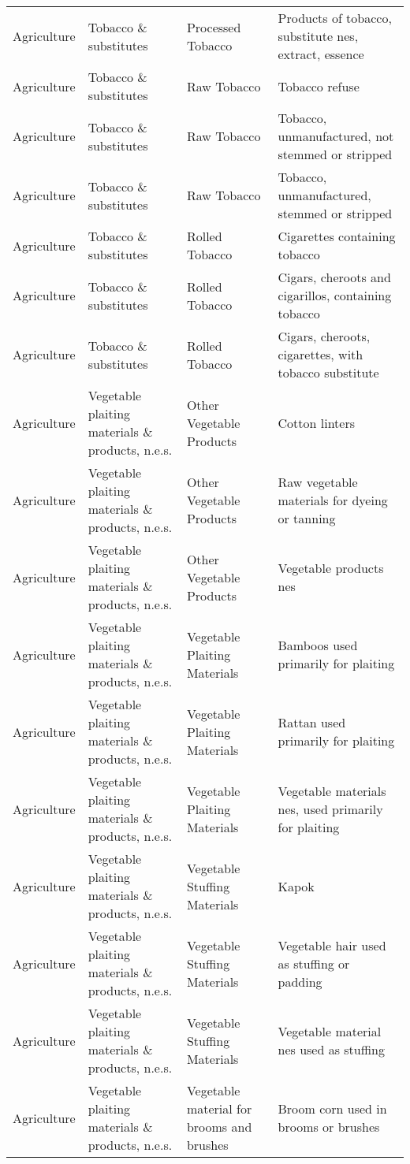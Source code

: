 \begin{appendices}
\begin{xltabular}{\textwidth}{|p{0.07\textwidth}|p{0.28\textwidth}|p{0.24\textwidth}|p{0.31\textwidth}|}
	Agriculture & Tobacco \& substitutes & Processed Tobacco & Products of tobacco, substitute nes, extract, essence \\
	Agriculture & Tobacco \& substitutes & Raw Tobacco & Tobacco refuse \\
	Agriculture & Tobacco \& substitutes & Raw Tobacco & Tobacco, unmanufactured, not stemmed or stripped \\
	Agriculture & Tobacco \& substitutes & Raw Tobacco & Tobacco, unmanufactured, stemmed or stripped \\
	Agriculture & Tobacco \& substitutes & Rolled Tobacco & Cigarettes containing tobacco \\
	Agriculture & Tobacco \& substitutes & Rolled Tobacco & Cigars, cheroots and cigarillos, containing tobacco \\
	Agriculture & Tobacco \& substitutes & Rolled Tobacco & Cigars, cheroots, cigarettes, with tobacco substitute \\
	Agriculture & Vegetable plaiting materials \& products, n.e.s. & Other Vegetable Products & Cotton linters \\
	Agriculture & Vegetable plaiting materials \& products, n.e.s. & Other Vegetable Products & Raw vegetable materials for dyeing or tanning \\
	Agriculture & Vegetable plaiting materials \& products, n.e.s. & Other Vegetable Products & Vegetable products nes \\
	Agriculture & Vegetable plaiting materials \& products, n.e.s. & Vegetable Plaiting Materials & Bamboos used primarily for plaiting \\
	Agriculture & Vegetable plaiting materials \& products, n.e.s. & Vegetable Plaiting Materials & Rattan used primarily for plaiting \\
	Agriculture & Vegetable plaiting materials \& products, n.e.s. & Vegetable Plaiting Materials & Vegetable materials nes, used primarily for plaiting \\
	Agriculture & Vegetable plaiting materials \& products, n.e.s. & Vegetable Stuffing Materials & Kapok \\
	Agriculture & Vegetable plaiting materials \& products, n.e.s. & Vegetable Stuffing Materials & Vegetable hair used as stuffing or padding \\
	Agriculture & Vegetable plaiting materials \& products, n.e.s. & Vegetable Stuffing Materials & Vegetable material nes used as stuffing \\
	Agriculture & Vegetable plaiting materials \& products, n.e.s. & Vegetable material for brooms and brushes & Broom corn used in brooms or brushes \\

\end{xltabular}
\end{appendices}
